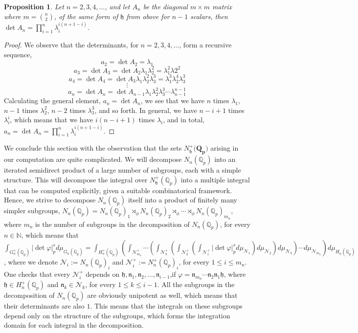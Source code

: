 \documentclass[12pt]{article}
\newtheorem{proposition}[theorem]{Proposition}
\begin{document}
\begin{proposition}
\label{prop.h.matrix.determinant}
Let $n=2,3,4,\dots$, and let $A_n$ 
be the diagonal $m\times m$ matrix where $m=\binom{n}{2}$, of the same form of $\mathfrak{h}$ from above for $n-1$ scalars, then $\det A_n=\prod_{i=1}^{n}\lambda_i^{i(n+1-i)}$.
\end{proposition}
\begin{proof}
We observe that the determinants, for $n=2,3,4,\dots$, form a recursive sequence,
$$a_2=\det A_2=\lambda_1$$
$$a_3=\det A_3=\det A_2\lambda_1\lambda_2^2=\lambda_1^2\lambda2^2$$
$$a_4=\det A_4=\det A_3\lambda_1\lambda_2^2\lambda_3^3=\lambda_1^3\lambda_2^4\lambda_3^3$$
$$\vdots$$
$$a_n=\det A_n=\det A_{n-1}\lambda_1\lambda_2^2\lambda_3^3\cdots\lambda_{n-1}^{n-1}$$
Calculating the general element, $a_n=\det A_n$, we see that we have $n$ times $\lambda_1$, $n-1$ times $\lambda_2^2$, $n-2$ times $\lambda_3^3$, and so forth. In general, we have $n-i+1$ times $\lambda_i^i$, which means that we have $i(n-i+1)$ times $\lambda_i$, and in total, $a_n=\det A_n=\prod_{i=1}^n\lambda_i^{i(n+1-i)}$.
\end{proof}
We conclude this section with the observation that the sets $N_{\mathfrak{h}}^+(\mathbf{{Q}_p)}$ arising in our computation are quite complicated. We will decompose $N_n(\mathbb{Q}_p)$ into an iterated semidirect product of a large number of subgroups, each with a simple structure. This will decompose the integral over $N_{\mathfrak{h}}^+(\mathbb{Q}_p)$ into a multiple integral that can be computed explicitly, given a suitable combinatorical framework. Hence, we strive to decompose $N_n(\mathbb{Q}_p)$ itself into a product of finitely many simpler subgroups, $N_n(\mathbb{Q}_p)= N_n(\mathbb{Q}_p)_1\rtimes_{\phi} N_n(\mathbb{Q}_p)_2\rtimes_{\phi}\cdots\rtimes_{\phi} N_n(\mathbb{Q}_p)_{m_n}$, where $m_n$ is the number of subgroups in the decomposition of $N_n(\mathbb{Q}_p)$, for every $n\in\mathbb{N}$, which means that $\displaystyle\int_{G_n^+(\mathbb{Q}_p)}|\det\varphi|_p^sd\mu_{G_n(\mathbb{Q}_p)}=\displaystyle\int_{H_n^+(\mathbb{Q}_p)}\left(\displaystyle\int_{\mathcal{N}^+_{m_n}}\cdots\left(\displaystyle\int_{\mathcal{N}^+_3}\left(\displaystyle\int_{\mathcal{N}^+_2}\left(\displaystyle\int_{\mathcal{N}^+_1}|\det\varphi|_p^sd\mu_{\mathcal{N}_1}\right)d\mu_{\mathcal{N}_2}\right)d\mu_{\mathcal{N}_3}\right)\cdots d\mu_{\mathcal{N}_{m_n}}\right)d\mu_{H_n(\mathbb{Q}_p)}$, where we denote $\mathcal{N}_i:=N_n(\mathbb{Q}_p)_i$ and $\mathcal{N}^+_i:=N_n^+(\mathbb{Q}_p)_i$, for every $1\leq i\leq m_n$. One checks that every $\mathcal{N}^+_i$ depends on $\mathfrak{h},\mathfrak{n}_1,\mathfrak{n}_2,\dots,\mathfrak{n}_{i-1}$,if $\varphi=\mathfrak{n}_{m_n}\cdots\mathfrak{n}_2\mathfrak{n}_1\mathfrak{h}$, where $\mathfrak{h}\in H_n^+(\mathbb{Q}_p)$ and $\mathfrak{n}_k\in\mathcal{N}_{k}$, for every $1\leq k\leq i-1$. 
All the subgroups in the decomposition of $N_n(\mathbb{Q}_p)$ are obviously unipotent as well, which means that their determinants are also $1$. This means that the integrals on these subgroups depend only on the structure of the subgroups, which forms the integration domain for each integral in the decomposition.
\end{document}
